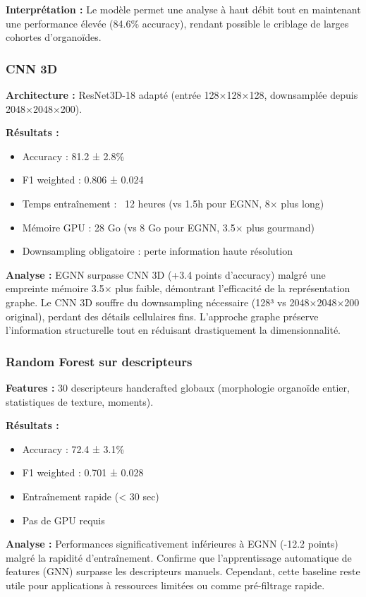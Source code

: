 \textbf{Interprétation :}
Le modèle permet une analyse à haut débit tout en maintenant une performance élevée (84.6\% accuracy), rendant possible le criblage de larges cohortes d'organoïdes.

\subsubsection{CNN 3D}

\textbf{Architecture :}
ResNet3D-18 adapté (entrée 128×128×128, downsamplée depuis 2048×2048×200).

\textbf{Résultats :}
\begin{itemize}
    \item Accuracy : 81.2 ± 2.8\%
    \item F1 weighted : 0.806 ± 0.024
    \item Temps entraînement : ~12 heures (vs 1.5h pour EGNN, 8× plus long)
    \item Mémoire GPU : 28 Go (vs 8 Go pour EGNN, 3.5× plus gourmand)
    \item Downsampling obligatoire : perte information haute résolution
\end{itemize}

\textbf{Analyse :}
EGNN surpasse CNN 3D (+3.4 points d'accuracy) malgré une empreinte mémoire 3.5× plus faible, démontrant l'efficacité de la représentation graphe. Le CNN 3D souffre du downsampling nécessaire (128³ vs 2048×2048×200 original), perdant des détails cellulaires fins. L'approche graphe préserve l'information structurelle tout en réduisant drastiquement la dimensionnalité.

\subsubsection{Random Forest sur descripteurs}

\textbf{Features :}
30 descripteurs handcrafted globaux (morphologie organoïde entier, statistiques de texture, moments).

\textbf{Résultats :}
\begin{itemize}
    \item Accuracy : 72.4 ± 3.1\%
    \item F1 weighted : 0.701 ± 0.028
    \item Entraînement rapide (< 30 sec)
    \item Pas de GPU requis
\end{itemize}

\textbf{Analyse :}
Performances significativement inférieures à EGNN (-12.2 points) malgré la rapidité d'entraînement. Confirme que l'apprentissage automatique de features (GNN) surpasse les descripteurs manuels. Cependant, cette baseline reste utile pour applications à ressources limitées ou comme pré-filtrage rapide.

